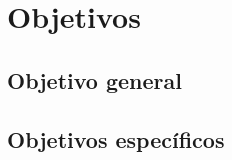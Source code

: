 \section{Objetivos}
    
        \subsection{Objetivo general}
        \subsection{Objetivos específicos}